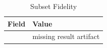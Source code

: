 \begin{table}[t]
\centering
\caption{Subset Fidelity}
\begin{tabular}{ll}
\toprule
Field & Value \\
\midrule
[TO BE FILLED AFTER RUNNING AUDIT] & missing result artifact \\
\bottomrule
\end{tabular}
\end{table}
